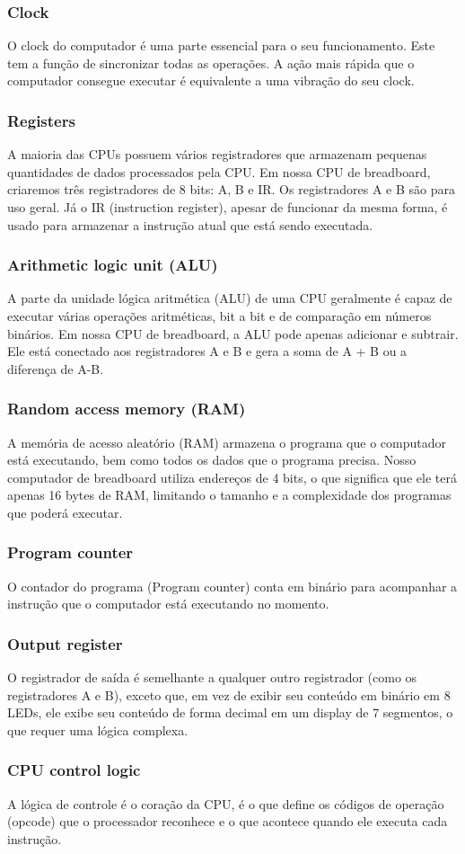 \subsubsection{Clock}
O clock do computador é uma parte essencial para o seu funcionamento. Este tem a função de sincronizar todas as operações. A ação mais rápida que o computador consegue executar é equivalente a uma vibração do seu clock.

\subsubsection{Registers}
A maioria das CPUs possuem vários registradores que armazenam pequenas quantidades de dados processados pela CPU. Em nossa CPU de breadboard, criaremos três registradores de 8 bits: A, B e IR. Os registradores A e B são para uso geral. Já o IR (instruction register), apesar de funcionar da mesma forma, é usado para armazenar a instrução atual que está sendo executada.

\subsubsection{Arithmetic logic unit (ALU)}
A parte da unidade lógica aritmética (ALU) de uma CPU geralmente é capaz de executar várias operações aritméticas, bit a bit e de comparação em números binários. Em nossa CPU de breadboard, a ALU pode apenas adicionar e subtrair. Ele está conectado aos registradores A e B e gera a soma de A + B ou a diferença de A-B.

\subsubsection{Random access memory (RAM)}
A memória de acesso aleatório (RAM) armazena o programa que o computador está executando, bem como todos os dados que o programa precisa. Nosso computador de breadboard utiliza endereços de 4 bits, o que significa que ele terá apenas 16 bytes de RAM, limitando o tamanho e a complexidade dos programas que poderá executar.

\subsubsection{Program counter}
O contador do programa (Program counter) conta em binário para acompanhar a instrução que o computador está executando no momento.

\subsubsection{Output register}
O registrador de saída é semelhante a qualquer outro registrador (como os registradores A e B), exceto que, em vez de exibir seu conteúdo em binário em 8 LEDs, ele exibe seu conteúdo de forma decimal em um display de 7 segmentos, o que requer uma lógica complexa.

\subsubsection{CPU control logic}
A lógica de controle é o coração da CPU, é o que define os códigos de operação (opcode) que o processador reconhece e o que acontece quando ele executa cada instrução.

\newpage


